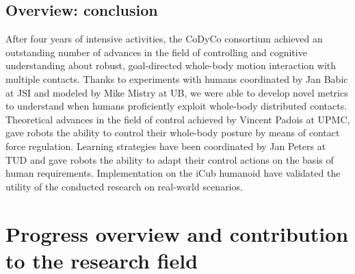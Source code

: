 \documentclass[12pt,a4paper,twoside]{article}
\begin{document}
\subsection{Overview: conclusion}

After four years of intensive activities, the CoDyCo consortium achieved an outstanding number of advances in the field of controlling and cognitive understanding about robust, goal-directed whole-body motion interaction with multiple contacts. Thanks to experiments with humans coordinated by Jan Babic at JSI and modeled by Mike Mistry at UB, we were able to develop novel metrics to understand when humans proficiently exploit whole-body distributed contacts. Theoretical advances in the field of control achieved by Vincent Padois at UPMC, gave robots the ability to control their whole-body posture by means of contact force regulation. Learning strategies have been coordinated by Jan Peters at TUD and gave robots the ability to adapt their control actions on the basis of human requirements. Implementation on the iCub humanoid have validated the utility of the conducted research on real-world scenarios.

\section{Progress overview and contribution to the research field}
\end{document}
